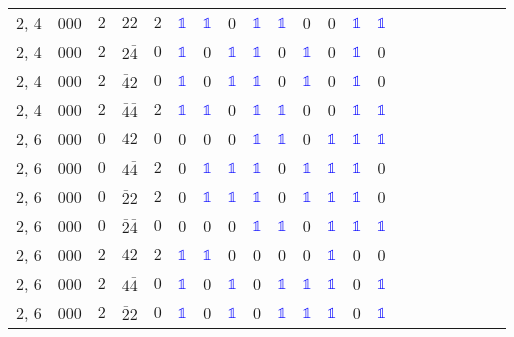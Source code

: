 \begin{longtable*}{c| cccccccccccccccccccc }
2, 4& 000& $2$& $22$& $2$& \textcolor{blue}{$\mathds{1}$}& \textcolor{blue}{$\mathds{1}$}& 0& \textcolor{blue}{$\mathds{1}$}& \textcolor{blue}{$\mathds{1}$}& 0& 0& \textcolor{blue}{$\mathds{1}$}& \textcolor{blue}{$\mathds{1}$}\\
2, 4& 000& $2$& $2\bar{4}$& $0$& \textcolor{blue}{$\mathds{1}$}& 0& \textcolor{blue}{$\mathds{1}$}& \textcolor{blue}{$\mathds{1}$}& 0& \textcolor{blue}{$\mathds{1}$}& 0& \textcolor{blue}{$\mathds{1}$}& 0\\
2, 4& 000& $2$& $\bar{4}2$& $0$& \textcolor{blue}{$\mathds{1}$}& 0& \textcolor{blue}{$\mathds{1}$}& \textcolor{blue}{$\mathds{1}$}& 0& \textcolor{blue}{$\mathds{1}$}& 0& \textcolor{blue}{$\mathds{1}$}& 0\\
2, 4& 000& $2$& $\bar{4}\bar{4}$& $2$& \textcolor{blue}{$\mathds{1}$}& \textcolor{blue}{$\mathds{1}$}& 0& \textcolor{blue}{$\mathds{1}$}& \textcolor{blue}{$\mathds{1}$}& 0& 0& \textcolor{blue}{$\mathds{1}$}& \textcolor{blue}{$\mathds{1}$}\\
2, 6& 000& $0$& $42$& $0$& 0& 0& 0& \textcolor{blue}{$\mathds{1}$}& \textcolor{blue}{$\mathds{1}$}& 0& \textcolor{blue}{$\mathds{1}$}& \textcolor{blue}{$\mathds{1}$}& \textcolor{blue}{$\mathds{1}$}\\
2, 6& 000& $0$& $4\bar{4}$& $2$& 0& \textcolor{blue}{$\mathds{1}$}& \textcolor{blue}{$\mathds{1}$}& \textcolor{blue}{$\mathds{1}$}& 0& \textcolor{blue}{$\mathds{1}$}& \textcolor{blue}{$\mathds{1}$}& \textcolor{blue}{$\mathds{1}$}& 0\\
2, 6& 000& $0$& $\bar{2}2$& $2$& 0& \textcolor{blue}{$\mathds{1}$}& \textcolor{blue}{$\mathds{1}$}& \textcolor{blue}{$\mathds{1}$}& 0& \textcolor{blue}{$\mathds{1}$}& \textcolor{blue}{$\mathds{1}$}& \textcolor{blue}{$\mathds{1}$}& 0\\
2, 6& 000& $0$& $\bar{2}\bar{4}$& $0$& 0& 0& 0& \textcolor{blue}{$\mathds{1}$}& \textcolor{blue}{$\mathds{1}$}& 0& \textcolor{blue}{$\mathds{1}$}& \textcolor{blue}{$\mathds{1}$}& \textcolor{blue}{$\mathds{1}$}\\
2, 6& 000& $2$& $42$& $2$& \textcolor{blue}{$\mathds{1}$}& \textcolor{blue}{$\mathds{1}$}& 0& 0& 0& 0& \textcolor{blue}{$\mathds{1}$}& 0& 0\\
2, 6& 000& $2$& $4\bar{4}$& $0$& \textcolor{blue}{$\mathds{1}$}& 0& \textcolor{blue}{$\mathds{1}$}& 0& \textcolor{blue}{$\mathds{1}$}& \textcolor{blue}{$\mathds{1}$}& \textcolor{blue}{$\mathds{1}$}& 0& \textcolor{blue}{$\mathds{1}$}\\
2, 6& 000& $2$& $\bar{2}2$& $0$& \textcolor{blue}{$\mathds{1}$}& 0& \textcolor{blue}{$\mathds{1}$}& 0& \textcolor{blue}{$\mathds{1}$}& \textcolor{blue}{$\mathds{1}$}& \textcolor{blue}{$\mathds{1}$}& 0& \textcolor{blue}{$\mathds{1}$}\\

\end{longtable*}
